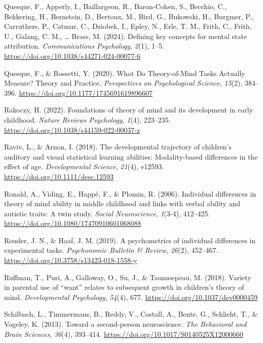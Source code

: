 \documentclass[
]{scrbook}
\newlength{\cslhangindent}
\newenvironment{CSLReferences}[2] %
 {\begin{list}{}{%
  \setlength{\itemindent}{0pt}
  \setlength{\leftmargin}{0pt}
  \setlength{\parsep}{0pt}
  \ifodd #1
   \setlength{\leftmargin}{\cslhangindent}
   \setlength{\itemindent}{-1\cslhangindent}
  \fi
  \setlength{\itemsep}{#2\baselineskip}}}
 {\end{list}}
\begin{document}
\begin{CSLReferences}{1}{0}
Quesque, F., Apperly, I., Baillargeon, R., Baron-Cohen, S., Becchio, C., Bekkering, H., Bernstein, D., Bertoux, M., Bird, G., Bukowski, H., Burgmer, P., Carruthers, P., Catmur, C., Dziobek, I., Epley, N., Erle, T. M., Frith, C., Frith, U., Galang, C. M., \ldots{} Brass, M. (2024). Defining key concepts for mental state attribution. \emph{Communications Psychology}, \emph{2}(1), 1--5. \url{https://doi.org/10.1038/s44271-024-00077-6}

Quesque, F., \& Rossetti, Y. (2020). What {Do Theory-of-Mind Tasks Actually Measure}? {Theory} and {Practice}. \emph{Perspectives on Psychological Science}, \emph{15}(2), 384--396. \url{https://doi.org/10.1177/1745691619896607}

Rakoczy, H. (2022). Foundations of theory of mind and its development in early childhood. \emph{Nature Reviews Psychology}, \emph{1}(4), 223--235. \url{https://doi.org/10.1038/s44159-022-00037-z}

Raviv, L., \& Arnon, I. (2018). The developmental trajectory of children's auditory and visual statistical learning abilities: Modality-based differences in the effect of age. \emph{Developmental Science}, \emph{21}(4), e12593. \url{https://doi.org/10.1111/desc.12593}

Ronald, A., Viding, E., Happé, F., \& Plomin, R. (2006). Individual differences in theory of mind ability in middle childhood and links with verbal ability and autistic traits: {A} twin study. \emph{Social Neuroscience}, \emph{1}(3-4), 412--425. \url{https://doi.org/10.1080/17470910601068088}

Rouder, J. N., \& Haaf, J. M. (2019). A psychometrics of individual differences in experimental tasks. \emph{Psychonomic Bulletin \& Review}, \emph{26}(2), 452--467. \url{https://doi.org/10.3758/s13423-018-1558-y}

Ruffman, T., Puri, A., Galloway, O., Su, J., \& Taumoepeau, M. (2018). Variety in parental use of {``want''} relates to subsequent growth in children's theory of mind. \emph{Developmental Psychology}, \emph{54}(4), 677. \url{https://doi.org/10.1037/dev0000459}

Schilbach, L., Timmermans, B., Reddy, V., Costall, A., Bente, G., Schlicht, T., \& Vogeley, K. (2013). Toward a second-person neuroscience. \emph{The Behavioral and Brain Sciences}, \emph{36}(4), 393--414. \url{https://doi.org/10.1017/S0140525X12000660}


\end{CSLReferences}
\end{document}
